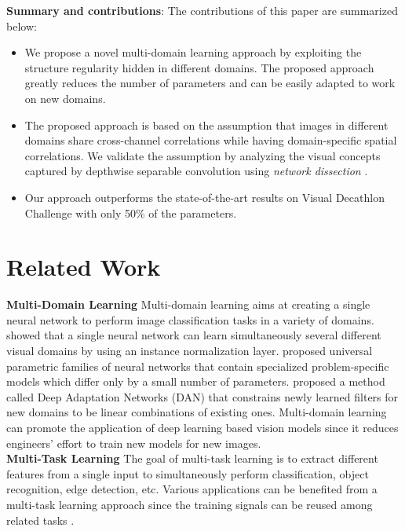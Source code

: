 \documentclass[letterpaper]{article} \usepackage{aaai19}  \usepackage{times}  \usepackage{helvet}  \usepackage{courier}  \usepackage{url}  \usepackage{graphicx}  \usepackage{amssymb}
\begin{document}
\noindent\textbf{Summary and contributions}: The contributions of this paper are summarized below:
\begin{itemize}
    \item We propose a novel multi-domain learning approach by exploiting the structure regularity hidden in different domains. The proposed approach greatly reduces the number of parameters and can be easily adapted to work on new domains.
    
    \item The proposed approach is based on the assumption that images in different domains share cross-channel correlations while having domain-specific spatial correlations. We validate the assumption by analyzing the visual concepts captured by depthwise separable convolution using \textit{network dissection} \cite{bau2017network}.

    \item Our approach outperforms the state-of-the-art results on Visual Decathlon Challenge with only 50\% of the parameters.
    
\end{itemize}

\section{Related Work}

\noindent\textbf{Multi-Domain Learning} Multi-domain learning aims at creating a single neural network to perform image classification tasks in a variety of domains. \cite{bilen2017universal} showed that a single neural network can learn simultaneously several different visual domains by using an instance normalization layer. \cite{rebuffi2017learning,rebuffi18efficient} proposed universal parametric families of neural networks that contain specialized problem-specific models which differ only by a small number of parameters. \cite{rosenfeld2017incremental} proposed a method called Deep Adaptation Networks (DAN) that constrains newly learned filters for new domains to be linear combinations of existing ones. Multi-domain learning can promote the application of deep learning based vision models since it reduces engineers' effort to train new models for new images.
\\

\noindent\textbf{Multi-Task Learning} The goal of multi-task learning \cite{bilen2016integrated,doersch2017multi,kokkinos2017ubernet,wang2017transitive} is to extract different features from a single input to simultaneously perform classification, object recognition, edge detection, etc. Various applications can be benefited from a multi-task learning approach since the training signals can be reused among related tasks \cite{caruana1997multitask,zamir2018taskonomy}. 
\\
\end{document}

